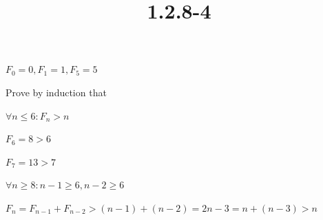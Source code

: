 \documentclass{article}
\title{1.2.8-4}
\begin{document}
\maketitle

\( F_0 = 0, F_1 = 1, F_5 = 5 \)

Prove by induction that

\( \forall n \leq 6: F_n > n \)

\( F_6 = 8 > 6 \)

\( F_7 = 13 > 7 \)

\( \forall n \geq 8: n - 1 \geq 6, n - 2 \geq 6 \)

\( F_n = F_{n-1} + F_{n-2} > (n - 1) + (n - 2) = 2n-3 = n + (n-3) > n \)
\end{document}
